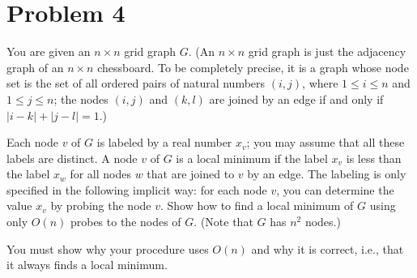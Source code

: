 ﻿\documentclass[12pt,a4paper]{article}
\begin{document}
\section{Problem 4}

    You are given an $n \times n$ grid graph $G$. (An $n \times n$ grid graph is just the adjacency graph of an $n \times n$ chessboard. To be completely precise, it is a graph whose node set is the set of all ordered pairs of natural numbers $(i,j)$, where $1 \leq i \leq n$ and $1 \leq j \leq n$; the nodes $(i,j)$ and $(k,l)$ are joined by an edge if and only if $|i-k| + |j-l| = 1$.)

    Each node $v$ of $G$ is labeled by a real number $x_v$; you may assume that all these labels are distinct. A node $v$ of $G$ is a local minimum if the label $x_v$ is less than the label $x_w$ for all nodes $w$ that are joined to $v$ by an edge. The labeling is only specified in the following implicit way: for each node $v$, you can determine the value $x_v$ by probing the node $v$. Show how to find a local minimum of $G$ using only $O(n)$ probes to the nodes of $G$. (Note that $G$ has $n^2$ nodes.)

    You must show why your procedure uses $O(n)$ and why it is correct, i.e., that it always finds a local minimum.
\end{document}
